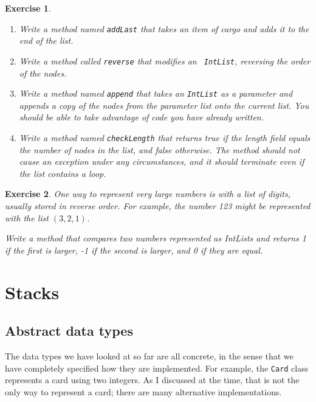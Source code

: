 \documentclass[12pt]{book}
\theoremstyle{exercise}
\newtheorem{exercise}{Exercise}[chapter]
\begin{document}
\begin{exercise}
\begin{enumerate}
\item Write a method named {\tt addLast} that takes an item of
cargo and adds it to the end of the list.

\item Write a method called {\tt reverse} that modifies an {\tt
IntList}, reversing the order of the nodes.

\item Write a method named {\tt append} that takes an {\tt IntList}
as a parameter and appends a {\em copy} of the nodes from the
parameter list onto the current list.  You should be able to take
advantage of code you have already written.

\item Write a method named {\tt checkLength} that returns true if the
length field equals the number of nodes in the list, and false
otherwise.  The method should not cause an exception under any
circumstances, and it should terminate even if the list contains a
loop.

\end{enumerate}
\end{exercise}


\begin{exercise}
One way to represent very large numbers is with a list of digits,
usually stored in reverse order.  For example, the number 123 might
be represented with the list $(3, 2, 1)$.

Write a method that compares two numbers represented as IntLists
and returns 1 if the first is larger, -1 if the second is larger, and
0 if they are equal.
\end{exercise}



\chapter{Stacks}

\section{Abstract data types}

The data types we have looked at so far are all concrete, in the
sense that we have completely specified how they are implemented.
For example, the {\tt Card} class represents a card using two
integers.  As I discussed at the time, that is not the only way
to represent a card; there are many alternative implementations.
\end{document}
